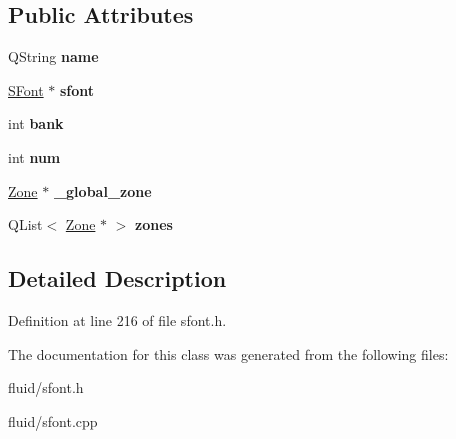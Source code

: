 \subsection*{Public Attributes}
\begin{DoxyCompactItemize}
\item 
\mbox{\label{class_fluid_s_1_1_preset_abf502b4fe3584e42686133272bf14538}} 
Q\+String {\bfseries name}
\item 
\mbox{\label{class_fluid_s_1_1_preset_aa2446569e725333d3d2dee157974ec7c}} 
\hyperlink{class_fluid_s_1_1_s_font}{S\+Font} $\ast$ {\bfseries sfont}
\item 
\mbox{\label{class_fluid_s_1_1_preset_aebfdc0f860c3f805b904416e4085b6fd}} 
int {\bfseries bank}
\item 
\mbox{\label{class_fluid_s_1_1_preset_a0ab0157618741adf09bc2e69da788d79}} 
int {\bfseries num}
\item 
\mbox{\label{class_fluid_s_1_1_preset_acae6b2ae63a70781977530b2747f76f9}} 
\hyperlink{class_fluid_s_1_1_zone}{Zone} $\ast$ {\bfseries \+\_\+global\+\_\+zone}
\item 
\mbox{\label{class_fluid_s_1_1_preset_afc10ab657b7960d60350681551f739b3}} 
Q\+List$<$ \hyperlink{class_fluid_s_1_1_zone}{Zone} $\ast$ $>$ {\bfseries zones}
\end{DoxyCompactItemize}


\subsection{Detailed Description}


Definition at line 216 of file sfont.\+h.



The documentation for this class was generated from the following files\+:\begin{DoxyCompactItemize}
\item 
fluid/sfont.\+h\item 
fluid/sfont.\+cpp\end{DoxyCompactItemize}
